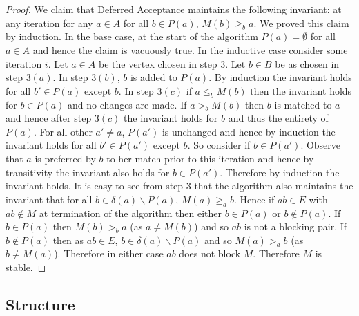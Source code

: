 \begin{proof}
We claim that Deferred Acceptance maintains the following invariant: at any iteration for any $a \in A$ for all $b \in P(a)$, $M(b) \geq_b a$. We proved this claim by induction. In the base case, at the start of the algorithm $P(a) = \emptyset$ for all $a \in A$ and hence the claim is vacuously true. In the inductive case consider some iteration $i$. Let $a\in A$ be the vertex chosen in step $3$. Let $b \in B$ be as chosen in step $3(a)$. In step $3(b)$, $b$ is added to $P(a)$. By induction the invariant holds for all $b' \in P(a)$ except $b$. In step $3(c)$ if $a \leq_b M(b)$ then the invariant holds for $b \in P(a)$ and no changes are made. If $a >_b M(b)$ then $b$ is matched to $a$ and hence after step $3(c)$ the invariant holds for $b$ and thus the entirety of $P(a)$. For all other $a' \neq a$, $P(a')$ is unchanged and hence by induction the invariant holds for all $b' \in P(a')$ except $b$. So consider if $b \in P(a')$. Observe that $a$ is preferred by $b$ to her match prior to this iteration and hence by transitivity the invariant also holds for $b \in P(a')$. Therefore by induction the invariant holds. It is easy to see from step $3$ that the algorithm also maintains the invariant that for all $b \in \delta(a)\backslash P(a)$, $M(a) \geq_a b$. Hence if $ab \in E$ with $ab \not\in M$ at termination of the algorithm then either $b \in P(a)$ or $b \not\in P(a)$. If $b \in P(a)$ then $M(b) >_b a$ (as $a \neq M(b)$) and so $ab$ is not a blocking pair. If $b \not\in P(a)$ then as $ab \in E$, $b \in \delta(a) \backslash P(a)$ and so $M(a) >_a b$ (as $b \neq M(a)$). Therefore in either case $ab$ does not block $M$. Therefore $M$ is stable.
\end{proof}
\subsection{Structure}\label{SM:STRUCTURE}
